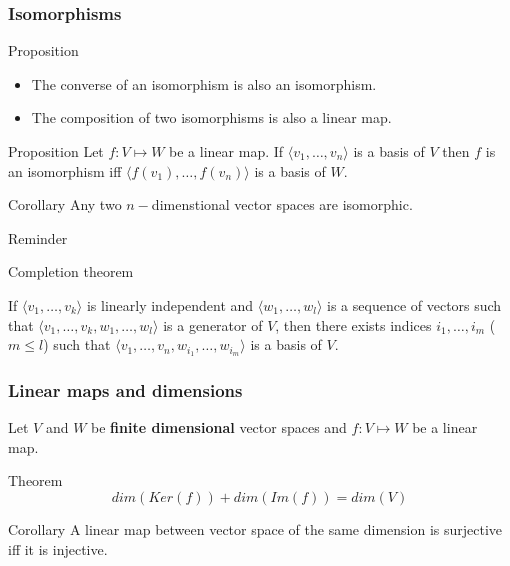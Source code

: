 \documentclass{beamer}
\begin{document}
\begin{frame}
  \frametitle{Isomorphisms}
  \begin{block}{Proposition}
    \begin{itemize}
    \item The converse of an isomorphism is also an isomorphism.
    \item The composition of two isomorphisms is also a linear map.
    \end{itemize}
  \end{block}

  \begin{block}{Proposition}
    Let $f: V \mapsto W$ be a linear map. If $\langle v_1, \dots, v_n \rangle$ is a basis of $V$ then $f$ is an isomorphism iff $\langle f(v_1), \dots, f(v_n) \rangle$ is a basis of $W$.
  \end{block}

  \begin{block}{Corollary}
    Any two $n-$dimenstional vector spaces are isomorphic.
  \end{block}
\end{frame}


\begin{frame}{Reminder}
  \begin{block}{Completion theorem}
    
    If $\langle v_1, \dots, v_k \rangle$ is linearly independent and $\langle w_1, \dots, w_l \rangle$ is a sequence of vectors such that $\langle v_1, \dots, v_k, w_1, \dots, w_l \rangle$ is a generator of $V$, then there exists indices $i_1, \dots, i_m$ ($m \le l$) such that $\langle v_1, \dots, v_n, w_{i_1}, \dots, w_{i_m} \rangle$ is a basis of $V$.
  \end{block}
  
\end{frame}

\begin{frame}
  \frametitle{Linear maps and dimensions}
  Let $V$ and $W$ be {\bf finite dimensional} vector spaces and $f: V \mapsto W$ be a linear map.

  \begin{block}{Theorem}
    \[dim(Ker(f)) + dim(Im(f)) = dim(V)\]
  \end{block}

  \begin{block}{Corollary}
    A linear map between vector space of the same dimension is surjective iff it is injective.
  \end{block}
\end{frame}
\end{document}
